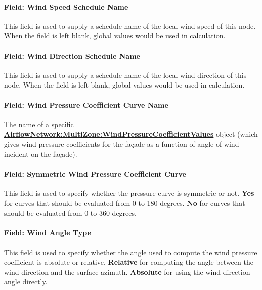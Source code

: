 \paragraph{Field: Wind Speed Schedule Name}\label{field-wind-speed-schedule-name}

This field is used to supply a schedule name of the local wind speed of this node. When the field is left blank, global values would be used in calculation.

\paragraph{Field: Wind Direction Schedule Name}\label{field-wind-dir-schedule-name}

This field is used to supply a schedule name of the local wind direction of this node. When the field is left blank, global values would be used in calculation.

\paragraph{Field: Wind Pressure Coefficient Curve Name}\label{field-wind-pressure-coeff-curve-name}

The name of a specific \textbf{\hyperref[airflownetworkmultizonewindpressurecoefficientvalues]{AirflowNetwork:MultiZone:WindPressureCoefficientValues}} object (which gives wind pressure coefficients for the façade as a function of angle of wind incident on the façade).

\paragraph{Field: Symmetric Wind Pressure Coefficient Curve}\label{field-sym-windp-curve-name}

This field is used to specify whether the pressure curve is symmetric or not. \textbf{Yes} for curves that should be evaluated from 0 to 180 degrees. \textbf{No} for curves that should be evaluated from 0 to 360 degrees.

\paragraph{Field: Wind Angle Type}

This field is used to specify whether the angle used to compute the wind pressure coefficient is absolute or relative. \textbf{Relative} for computing the angle between the wind direction and the surface azimuth. \textbf{Absolute} for using the wind direction angle directly.


